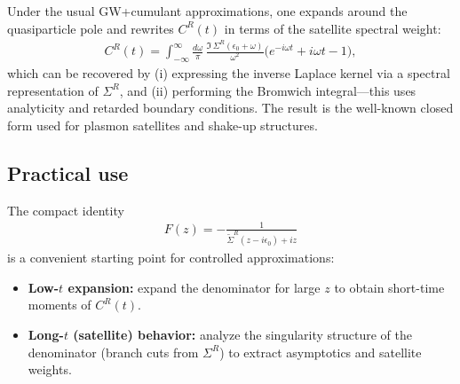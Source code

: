 Under the usual GW+cumulant approximations,
one expands around the quasiparticle pole and rewrites
$C^R(t)$ in terms of the satellite spectral weight:
\begin{align}
C^R(t)
= \int_{-\infty}^{\infty}
\frac{d\omega}{\pi}\,
\frac{\Im\,\Sigma^R(\epsilon_0 + \omega)}{\omega^2}
\big(e^{-i\omega t} + i\omega t - 1\big),
\end{align}
which can be recovered by (i) expressing the inverse Laplace kernel
via a spectral representation of $\Sigma^R$, and
(ii) performing the Bromwich integral—this uses analyticity and
retarded boundary conditions.
The result is the well-known closed form used for plasmon satellites
and shake-up structures.

\subsection*{Practical use}

The compact identity
\begin{align}
F(z)
= -\frac{1}{\tilde{\Sigma}^R(z - i\epsilon_0) + i z}
\end{align}
is a convenient starting point for controlled approximations:
\begin{itemize}
  \item \textbf{Low-$t$ expansion:} expand the denominator for large $z$
        to obtain short-time moments of $C^R(t)$.
  \item \textbf{Long-$t$ (satellite) behavior:} analyze the singularity
        structure of the denominator (branch cuts from $\Sigma^R$)
        to extract asymptotics and satellite weights.
\end{itemize}

